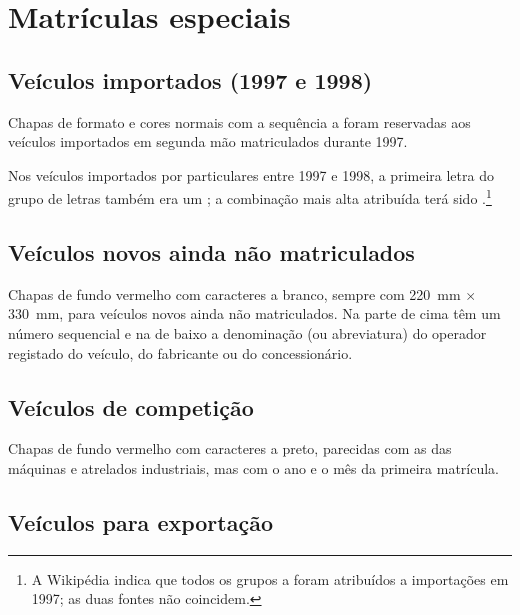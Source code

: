 \section{Matrículas especiais}

\subsection{Veículos importados (1997 e 1998)}\label{sec:importados}

Chapas de formato e cores normais com a sequência  a
 foram reservadas aos veículos importados em segunda mão
matriculados durante 1997.

Nos veículos importados por particulares entre 1997 e 1998, a primeira letra do
grupo de letras também era um ; a combinação mais alta atribuída terá
sido .\footnote{A Wikipédia indica que todos os grupos  a 
foram atribuídos a importações em 1997; as duas fontes não coincidem.}


\subsection{Veículos novos ainda não matriculados}

Chapas de fundo vermelho com caracteres a branco, sempre com 220~mm $\times$
330~mm, para veículos novos ainda não matriculados. Na parte de cima têm um
número sequencial e na de baixo a denominação (ou abreviatura) do operador
registado do veículo, do fabricante ou do concessionário.


\subsection{Veículos de competição}

Chapas de fundo vermelho com caracteres a preto, parecidas com as das máquinas e
atrelados industriais, mas com o ano e o mês da primeira matrícula.


\subsection{Veículos para exportação}

